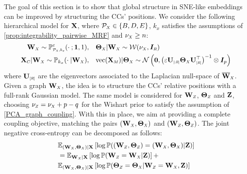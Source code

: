 The goal of this section is to show that global structure in SNE-like embeddings can be improved by structuring the CCs' positions. We consider the following hierarchical model for $\mathbf{X}$, where $\mathcal{P}_{\scaleto{X}{4pt}} \in \{B,D,E\}$, $k_x$ satisfies the assumptions of \cref{prop:integrability_pairwise_MRF} and $\nu_{\scaleto{X}{4pt}} \geq n$:
\begin{align*}
    \Wb_{\scaleto{X}{4pt}} \sim \mathbb{P}_{\scaleto{\mathcal{P}_{\scaleto{X}{3pt}},k_x}{5pt}}^{\varepsilon}(\cdot \: ; \bm{1},1), &\quad \bm{\Theta}_{\scaleto{X}{4pt}} | \Wb_{\scaleto{X}{4pt}} \sim \mathcal{W}(\nu_{\scaleto{X}{4pt}}, \bm{I}_{\scaleto{R}{4pt}}) \\
    \Xb_{\scaleto{C}{4pt}} |\Wb_{\scaleto{X}{4pt}} \sim \mathbb{P}_{k_x}(\cdot \:| \Wb_{\scaleto{X}{4pt}}), &\quad \mathrm{vec}(\Xb_{\scaleto{M}{4pt}}) | \bm{\Theta}_{\scaleto{X}{4pt}} \sim \mathcal{N}\left(\bm{0}, \left(\varepsilon \Ub_{\scaleto{[:R]}{5pt}}  \bm{\Theta}_{\scaleto{X}{4pt}}\Ub^\top_{\scaleto{[R]}{5pt}}\right)^{-1} \otimes \bm{I}_p\right)
\end{align*}
where $\Ub_{\scaleto{[R]}{5pt}}$ are the eigenvectors associated to the Laplacian null-space of $\overline{\Wb}_{\scaleto{X}{4pt}}$. Given a graph $\Wb_{\scaleto{X}{4pt}}$, the idea is to structure the CCs' relative positions with a full-rank Gaussian model.
The same model is considered for $\Wb_{\scaleto{Z}{4pt}}$, $\bm{\Theta}_{\scaleto{Z}{4pt}}$ and $\mathbf{Z}$, choosing $\nu_{\scaleto{Z}{4pt}} = \nu_{\scaleto{X}{4pt}} + p - q$ for the Wishart prior to satisfy the assumption of \cref{PCA_graph_coupling}.  With this in place, we aim at providing a complete coupling objective, matching the pairs  $(\Wb_{\scaleto{X}{4pt}},\bm{\Theta}_{\scaleto{X}{4pt}})$ and  $(\Wb_{\scaleto{Z}{4pt}},\bm{\Theta}_{\scaleto{Z}{4pt}})$. The joint negative cross-entropy can be decomposed as follows:
\begin{align}
    &\mathbb{E}_{(\Wb_{\scaleto{X}{3pt}}, \bm{\Theta}_{\scaleto{X}{3pt}})|\Xb}\left[\log \mathbb{P}((\Wb_{\scaleto{Z}{4pt}},\bm{\Theta}_{\scaleto{Z}{4pt}}) = (\Wb_{\scaleto{X}{4pt}},\bm{\Theta}_{\scaleto{X}{4pt}}) | \Zb)\right] \nonumber\\
    &= \mathbb{E}_{\Wb_{\scaleto{X}{3pt}}|\Xb}\left[\log \mathbb{P}(\Wb_{\scaleto{Z}{4pt}} = \Wb_{\scaleto{X}{4pt}} | \Zb)\right] + \label{eq:loss_LW} \\
    & \mathbb{E}_{(\Wb_{\scaleto{X}{3pt}},\bm{\Theta}_{\scaleto{X}{3pt}})|\Xb}\left[ \log \mathbb{P}(\bm{\Theta}_{\scaleto{Z}{4pt}} = \bm{\Theta}_{\scaleto{X}{4pt}}| \Wb_{\scaleto{Z}{4pt}} = \Wb_{\scaleto{X}{4pt}}, \Zb) \right] \label{eq:add_term_Coupling}
\end{align}
